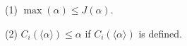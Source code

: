 (1) $\max(\alpha) \leq J(\alpha)$.

(2) $C_i(\langle \alpha \rangle) \leq \alpha$ if $C_i(\langle \alpha \rangle)$ is defined.
